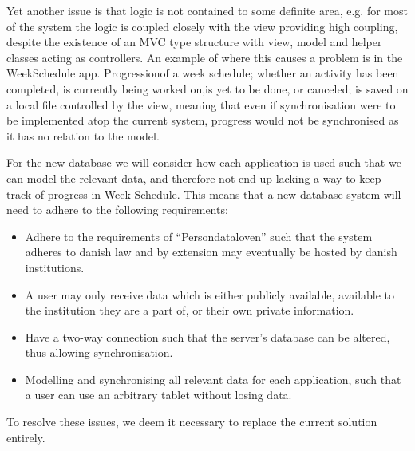 Yet another issue is that logic is not contained to some definite area, e.g. for most of the system the logic is coupled closely with the view providing high coupling, despite the existence of an MVC type structure with view, model and helper classes acting as controllers.
An example of where this causes a problem is in the WeekSchedule app.
Progressionof a week schedule; whether an activity has been completed, is currently being worked on,is yet to be done, or canceled; is saved on a local file controlled by the view, meaning that even if synchronisation were to be implemented atop the current system, progress would not be synchronised as it has no relation to the model.

For the new database we will consider how each application is used such that we can model the relevant data, and therefore not end up lacking a way to keep track of progress in Week Schedule.
This means that a new database system will need to adhere to the following requirements:
\begin{itemize}
	\item Adhere to the requirements of ``Persondataloven'' such that the system adheres to danish law and by extension may eventually be hosted by danish institutions.
	\item A user may only receive data which is either publicly available, available to the institution they are a part of, or their own private information.
	\item Have a two-way connection such that the server's database can be altered, thus allowing synchronisation.
	\item Modelling and synchronising all relevant data for each application, such that a user can use an arbitrary tablet without losing data.
\end{itemize}
To resolve these issues, we deem it necessary to replace the current solution entirely.

